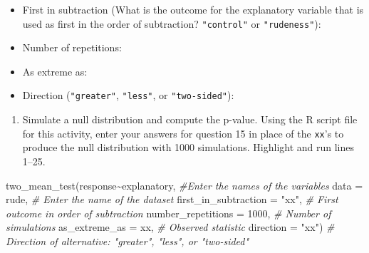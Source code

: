 \documentclass[
]{report}
\newenvironment{Shaded}{\begin{snugshade}}{\end{snugshade}}
\newcommand{\AttributeTok}[1]{\textcolor[rgb]{0.77,0.63,0.00}{#1}}
\newcommand{\CommentTok}[1]{\textcolor[rgb]{0.56,0.35,0.01}{\textit{#1}}}
\newcommand{\DecValTok}[1]{\textcolor[rgb]{0.00,0.00,0.81}{#1}}
\newcommand{\FunctionTok}[1]{\textcolor[rgb]{0.00,0.00,0.00}{#1}}
\newcommand{\NormalTok}[1]{#1}
\newcommand{\SpecialCharTok}[1]{\textcolor[rgb]{0.00,0.00,0.00}{#1}}
\newcommand{\StringTok}[1]{\textcolor[rgb]{0.31,0.60,0.02}{#1}}
\providecommand{\tightlist}{%
  \setlength{\itemsep}{0pt}\setlength{\parskip}{0pt}}
\begin{document}
\begin{itemize}
\tightlist
\item
  First in subtraction (What is the outcome for the explanatory variable that is used as first in the order of subtraction? \texttt{"control"} or \texttt{"rudeness"}):
\end{itemize}

\vspace{.2in}

\begin{itemize}
\tightlist
\item
  Number of repetitions:
\end{itemize}

\vspace{.2in}

\begin{itemize}
\tightlist
\item
  As extreme as:
\end{itemize}

\vspace{.2in}

\begin{itemize}
\tightlist
\item
  Direction (\texttt{"greater"}, \texttt{"less"}, or \texttt{"two-sided"}):
\end{itemize}

\vspace{.2in}

\begin{enumerate}
\def\labelenumi{\arabic{enumi}.}
\setcounter{enumi}{15}
\tightlist
\item
  Simulate a null distribution and compute the p-value. Using the R script file for this activity, enter your answers for question 15 in place of the \texttt{xx}'s to produce the null distribution with 1000 simulations. Highlight and run lines 1--25.
\end{enumerate}

\begin{Shaded}
\begin{Highlighting}[]
\FunctionTok{two\_mean\_test}\NormalTok{(response}\SpecialCharTok{\textasciitilde{}}\NormalTok{explanatory, }\CommentTok{\#Enter the names of the variables}
              \AttributeTok{data =}\NormalTok{ rude,  }\CommentTok{\# Enter the name of the dataset}
              \AttributeTok{first\_in\_subtraction =} \StringTok{"xx"}\NormalTok{, }\CommentTok{\# First outcome in order of subtraction}
              \AttributeTok{number\_repetitions =} \DecValTok{1000}\NormalTok{,  }\CommentTok{\# Number of simulations}
              \AttributeTok{as\_extreme\_as =}\NormalTok{ xx,  }\CommentTok{\# Observed statistic}
              \AttributeTok{direction =} \StringTok{"xx"}\NormalTok{)  }\CommentTok{\# Direction of alternative: "greater", "less", or "two{-}sided"}
\end{Highlighting}
\end{Shaded}
\end{document}
